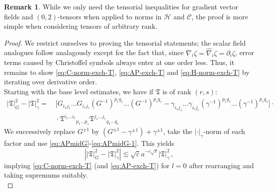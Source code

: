 \documentclass[11pt,leqno,textwidth=10cm]{amsart}
\numberwithin{equation}{section}
\theoremstyle{definition}
\newtheorem{remark}[definition]{Remark}
\theoremstyle{plain}
\newcommand{\1}{\mathbbm{1}}
\renewcommand{\epsilon}{\varepsilon}
\newcommand{\del}{\partial}
\newcommand{\nabhat}{\hat{\nabla}}
\begin{document}
\begin{remark}
While we only need the tensorial inequalities for gradient vector fields and $(0,2)$-tensors when applied to norms in $\mathcal{H}$ and $\mathcal{C}$, the proof is more simple when considering tensors of arbitrary rank.
\end{remark}
\begin{proof}
We restrict ourselves to proving the tensorial statements; the scalar field analogues follow analagously except for the fact that, since $\nabla_i\zeta=\nabhat_i\zeta=\del_i\zeta$, error terms caused by Christoffel symbols always enter at one order less. Thus, it remains to show \eqref{eq:C-norm-exch-T}, \eqref{eq:AP-exch-T} and \eqref{eq:H-norm-exch-T} by iterating over derivative order. \\
Starting with the base level estimates, we have if $\mathfrak{T}$ is of rank $(r,s)$:
\begin{align*}
\lvert\mathfrak{T}\rvert_G^2-\lvert\mathfrak{T}\rvert_\gamma^2=&\,\Bigr[G_{i_1j_1}\dots G_{i_rj_r} (G^{-1})^{p_1q_1}\dots(G^{-1})^{p_sq_s}-\gamma_{i_1j_1}\dots \gamma_{i_rj_r} (\gamma^{-1})^{p_1q_1}\dots(\gamma^{-1})^{p_sq_s}\Bigr]\cdot\\
&\,\cdot{\mathfrak{T}^{i_1\dots i_r}}_{p_1\dots p_s}{\mathfrak{T}^{j_1\dots j_r}}_{q_1\dots q_s}
\end{align*}
We successively replace $G^{\pm 1}$ by $(G^{\pm 1}-\gamma^{\pm 1})+\gamma^{\pm 1}$, %
take the $\lvert\cdot\rvert_\gamma$-norm of each factor and use \eqref{eq:APmidG}-\eqref{eq:APmidG-1}. This yields%
\begin{equation*}
\left\lvert\lvert\mathfrak{T}\rvert_{G}^2-\lvert\mathfrak{T}\rvert_\gamma^2\right\rvert\lesssim \sqrt{\epsilon}a^{-c\sqrt{\epsilon}}\lvert\mathfrak{T}\rvert_\gamma^2\,,
\end{equation*}
implying 
\eqref{eq:C-norm-exch-T} (and \eqref{eq:AP-exch-T}) for $l=0$ after rearranging and taking supremums suitably.\\

\end{proof}
\end{document}
